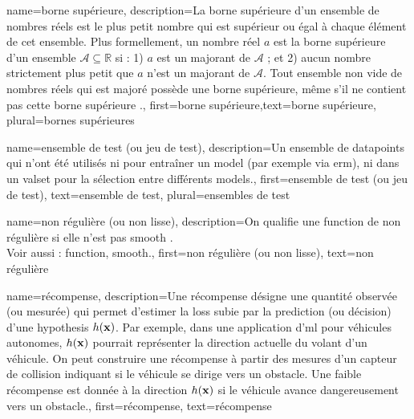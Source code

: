 {name={borne supérieure},
	description={La  borne supérieure d'un ensemble de nombres réels est 
		le plus petit nombre qui est supérieur ou égal à chaque élément de cet ensemble. 
		Plus formellement, un nombre réel $a$ est la borne supérieure d'un ensemble 
		$\mathcal{A} \subseteq \mathbb{R}$ si : 1) $a$ est un majorant de $\mathcal{A}$ ; 
		et 2) aucun nombre strictement plus petit que $a$ n'est un majorant de $\mathcal{A}$. 
		Tout ensemble non vide de nombres réels qui est majoré possède une borne supérieure, même s'il ne 
		contient pas cette borne supérieure \cite[Sec.~1.4]{RudinBookPrinciplesMatheAnalysis}.},
	first={borne supérieure},text={borne supérieure}, plural={bornes supérieures}
}

{name={ensemble de test (ou jeu de test)},
	description={Un ensemble de \glspl{datapoint} qui n'ont été utilisés ni pour entraîner un \gls{model} (par exemple via \gls{erm}), ni dans un \gls{valset} pour la sélection entre différents \glspl{model}.},
	first={ensemble de test (ou jeu de test)},
	text={ensemble de test}, plural={ensembles de test}
}

{name={non régulière (ou non lisse)},
	description={On qualifie une \gls{function} de non régulière si elle n’est pas \gls{smooth} \cite{nesterov04}.
		\\
		Voir aussi : \gls{function}, \gls{smooth}.},
	first={non régulière (ou non lisse)},
	text={non régulière}
}

{name={récompense},
	description={Une récompense désigne une quantité observée 
		(ou mesurée) qui permet d’estimer la \gls{loss} subie par la \gls{prediction} 
		(ou décision) d’une \gls{hypothesis} $h({\bf x})$. Par exemple, dans une 
		application d'\gls{ml} pour véhicules autonomes, $h({\bf x})$ pourrait représenter 
		la direction actuelle du volant d’un véhicule. On peut construire une récompense à partir 
		des mesures d’un capteur de collision indiquant si le véhicule se dirige vers un obstacle. 
		Une faible récompense est donnée à la direction $h({\bf x})$ si le véhicule 
		avance dangereusement vers un obstacle.},
	first={récompense}, text={récompense}}

